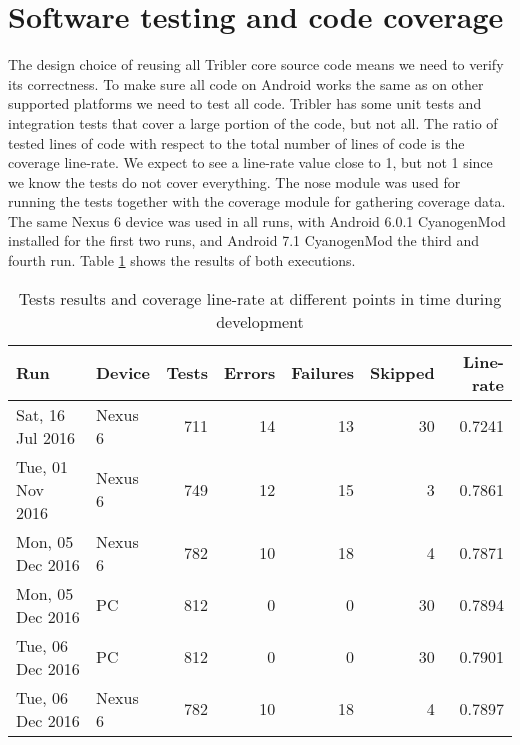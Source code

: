 \section{Software testing and code coverage}\label{sec:testing_coverage}
The design choice of reusing all Tribler core source code means we need to verify its correctness.
To make sure all code on Android works the same as on other supported platforms we need to test all code.
Tribler has some unit tests and integration tests that cover a large portion of the code, but not all.
The ratio of tested lines of code with respect to the total number of lines of code is the coverage line-rate.
We expect to see a line-rate value close to 1, but not 1 since we know the tests do not cover everything.
The nose module was used for running the tests together with the coverage module for gathering coverage data.
The same Nexus 6 device was used in all runs, with Android 6.0.1 CyanogenMod installed for the first two runs, and Android 7.1 CyanogenMod the third and fourth run.
Table \ref{table:testing_coverage} shows the results of both executions.
\begin{table}[H]
	\begin{tabular}{l | l | *{5}{r}} \hline
		Run                        & Device     & Tests & Errors & Failures & Skipped & Line-rate \\ \hline \hline
		Sat, 16 Jul 2016	 & Nexus 6    & 711   & 14       & 13          & 30          & 0.7241 \\ \hline %
		Tue, 01 Nov 2016  & Nexus 6    & 749   & 12       & 15          & 3            & 0.7861 \\ \hline %
		Mon, 05 Dec 2016 & Nexus 6    & 782   & 10		& 18		   & 4			   & 0.7871 \\ \hline %
		Mon, 05 Dec 2016 & PC            & 812   & 0         & 0            & 30          & 0.7894 \\ \hline %
		Tue, 06 Dec 2016  & PC             & 812   & 0         & 0            & 30          & 0.7901 \\ \hline %
		Tue, 06 Dec 2016  & Nexus 6     & 782   & 10       & 18          & 4            & 0.7897 \\ \hline %
	\end{tabular}
	\caption{Tests results and coverage line-rate at different points in time during development}
	\label{table:testing_coverage}
\end{table}
